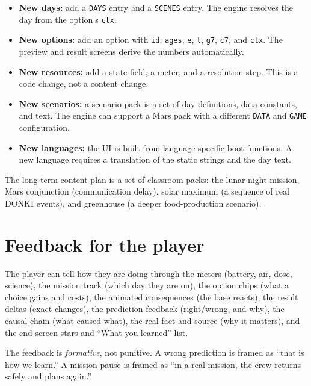 \documentclass[11pt,a4paper]{article}
\newcommand{\code}[1]{\texttt{#1}}
\begin{document}
\begin{itemize}
  \item \textbf{New days:} add a \code{DAYS} entry and a \code{SCENES} entry. The engine resolves the day from the option's \code{ctx}.
  \item \textbf{New options:} add an option with \code{id}, \code{ages}, \code{e}, \code{t}, \code{g7}, \code{c7}, and \code{ctx}. The preview and result screens derive the numbers automatically.
  \item \textbf{New resources:} add a state field, a meter, and a resolution step. This is a code change, not a content change.
  \item \textbf{New scenarios:} a scenario pack is a set of day definitions, data constants, and text. The engine can support a Mars pack with a different \code{DATA} and \code{GAME} configuration.
  \item \textbf{New languages:} the UI is built from language-specific boot functions. A new language requires a translation of the static strings and the day text.
\end{itemize}

The long-term content plan is a set of classroom packs: the lunar-night mission, Mars conjunction (communication delay), solar maximum (a sequence of real DONKI events), and greenhouse (a deeper food-production scenario).

\section{Feedback for the player}

The player can tell how they are doing through the meters (battery, air, dose, science), the mission track (which day they are on), the option chips (what a choice gains and costs), the animated consequences (the base reacts), the result deltas (exact changes), the prediction feedback (right/wrong, and why), the causal chain (what caused what), the real fact and source (why it matters), and the end-screen stars and ``What you learned'' list.

The feedback is \emph{formative}, not punitive. A wrong prediction is framed as ``that is how we learn.'' A mission pause is framed as ``in a real mission, the crew returns safely and plans again.''

\end{document}
